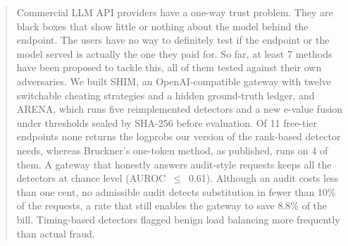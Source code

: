 \begin{abstract}
Commercial LLM API providers have a one-way trust problem. They are black boxes that show little
or nothing about the model behind the endpoint. The users have no way to definitely
test if the endpoint or the model served is actually the one they paid for. So far, at least 7
methods have been proposed to tackle this, all of them tested against their own adversaries. We
built SHIM, an OpenAI-compatible gateway with twelve switchable cheating strategies and a hidden
ground-truth ledger, and ARENA, which runs five reimplemented detectors and a new e-value fusion
under thresholds sealed by SHA-256 before evaluation. Of 11 free-tier endpoints none returns the
logprobs our version of the rank-based detector needs, whereas Bruckner's one-token method, as published, runs on 4 of them. A
gateway that honestly answers audit-style requests keeps all the detectors at
chance level (AUROC~$\le$~0.61). Although an audit costs less than one cent, no admissible audit
detects substitution in fewer than 10\% of the requests, a rate that still enables the gateway to
save 8.8\% of the bill. Timing-based detectors flagged benign load balancing more
frequently than actual fraud.
\end{abstract}
